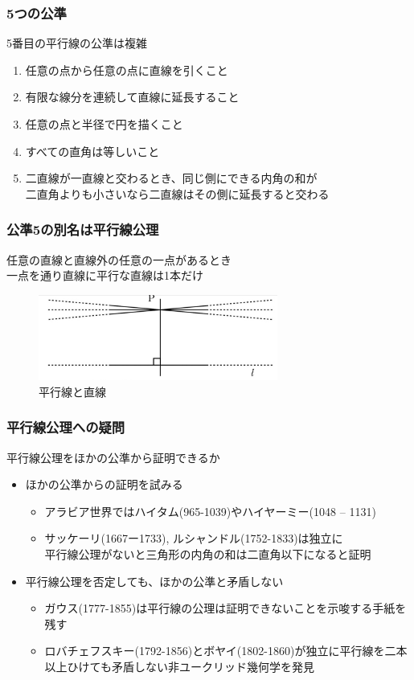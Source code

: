 \documentclass[unicode, 14pt, aspectratio=169]{beamer}
\begin{document}
\begin{frame}
  \frametitle{5つの公準}
  {\large 5番目の平行線の公準は複雑}
  \par
  \vspace{16pt}  
  \begin{enumerate}
  \item 任意の点から任意の点に直線を引くこと
  \item 有限な線分を連続して直線に延長すること
  \item 任意の点と半径で円を描くこと
  \item すべての直角は等しいこと
  \item 二直線が一直線と交わるとき、同じ側にできる内角の和が\\二直角よりも小さいなら二直線はその側に延長すると交わる
  \end{enumerate}
\end{frame}
\begin{frame}[t]
  \frametitle{公準5の別名は平行線公理}
  {\large 任意の直線と直線外の任意の一点があるとき\\一点を通り直線に平行な直線は1本だけ}
  \begin{figure}
    \includegraphics[width=0.7\textwidth]{images/axiom5.png}
    \caption{平行線と直線}
  \end{figure}
\end{frame}
\begin{frame}
  \frametitle{平行線公理への疑問}
  {\large 平行線公理をほかの公準から証明できるか}
  \begin{itemize}
  \item ほかの公準からの証明を試みる
    \begin{itemize}
    \item アラビア世界ではハイタム(965-1039)やハイヤーミー(1048 – 1131)
    \item サッケーリ(1667ー1733), ルシャンドル(1752-1833)は独立に\\
      平行線公理がないと三角形の内角の和は二直角以下になると証明
    \end{itemize}
  \item 平行線公理を否定しても、ほかの公準と矛盾しない
    \begin{itemize}
    \item ガウス(1777-1855)は平行線の公理は証明できないことを示唆する手紙を残す
    \item ロバチェフスキー(1792-1856)とボヤイ(1802-1860)が独立に平行線を二本以上ひけても矛盾しない非ユークリッド幾何学を発見
    \end{itemize}
  \end{itemize}
\end{frame}
\end{document}
